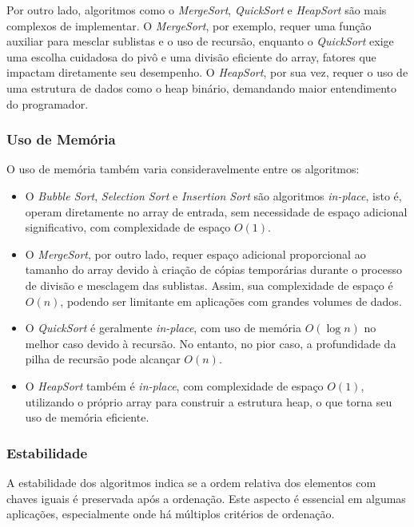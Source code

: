 \documentclass[a4paper,12pt]{article}
\begin{document}
Por outro lado, algoritmos como o \textit{MergeSort}, \textit{QuickSort} e \textit{HeapSort} são mais complexos de implementar. O \textit{MergeSort}, por exemplo, requer uma função auxiliar para mesclar sublistas e o uso de recursão, enquanto o \textit{QuickSort} exige uma escolha cuidadosa do pivô e uma divisão eficiente do array, fatores que impactam diretamente seu desempenho. O \textit{HeapSort}, por sua vez, requer o uso de uma estrutura de dados como o heap binário, demandando maior entendimento do programador.

\subsubsection{Uso de Memória}
O uso de memória também varia consideravelmente entre os algoritmos:

\begin{itemize}
    \item O \textit{Bubble Sort}, \textit{Selection Sort} e \textit{Insertion Sort} são algoritmos \textit{in-place}, isto é, operam diretamente no array de entrada, sem necessidade de espaço adicional significativo, com complexidade de espaço \( O(1) \). 
    \item O \textit{MergeSort}, por outro lado, requer espaço adicional proporcional ao tamanho do array devido à criação de cópias temporárias durante o processo de divisão e mesclagem das sublistas. Assim, sua complexidade de espaço é \( O(n) \), podendo ser limitante em aplicações com grandes volumes de dados.
    \item O \textit{QuickSort} é geralmente \textit{in-place}, com uso de memória \( O(\log n) \) no melhor caso devido à recursão. No entanto, no pior caso, a profundidade da pilha de recursão pode alcançar \( O(n) \).
    \item O \textit{HeapSort} também é \textit{in-place}, com complexidade de espaço \( O(1) \), utilizando o próprio array para construir a estrutura heap, o que torna seu uso de memória eficiente.
\end{itemize}

\subsubsection{Estabilidade}
A estabilidade dos algoritmos indica se a ordem relativa dos elementos com chaves iguais é preservada após a ordenação. Este aspecto é essencial em algumas aplicações, especialmente onde há múltiplos critérios de ordenação.
\end{document}

